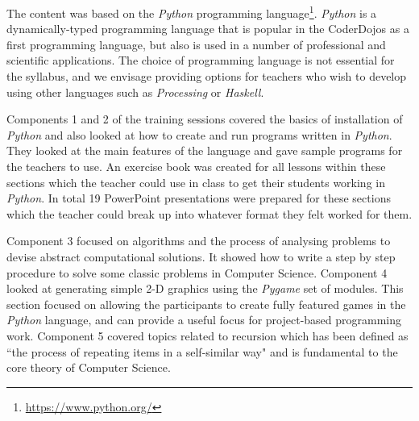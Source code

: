 \documentclass[a4paper]{article}
\begin{document}
The content was based on the \textit{Python} programming language\footnote{\url{https://www.python.org/}}. 
\textit{Python} is a dynamically-typed programming language that is popular in the CoderDojos as a first programming language, but also is used in a number of professional and scientific applications.  The choice of programming language is not essential for the syllabus, and we envisage providing options for teachers who wish to develop using other languages such as \textit{Processing} or \textit{Haskell}.

Components 1 and 2 of the training sessions covered the basics of installation of \textit{Python} and also looked at how to create and run programs written in \textit{Python}. They looked at the main features of the language and gave sample programs for the teachers to use. 
An exercise book was created for all lessons within these sections which the teacher could use in class to get their students working in \textit{Python}. In total 19 PowerPoint presentations were prepared for these sections which the teacher could break up into whatever format they felt worked for them. 

Component 3 focused on algorithms and the process of analysing problems to devise abstract computational solutions.  It showed how to write a step by step procedure to solve some classic problems in Computer Science. Component 4 looked at generating simple 2-D graphics using the \textit{Pygame} set of modules. This section focused on allowing the participants to create fully featured games in the \textit{Python} language, and can provide a useful focus for project-based programming work.  Component 5 covered topics related to recursion which has been defined as ``the process of repeating items in a self-similar way" and is fundamental to the core theory of Computer Science. \\



\end{document}
